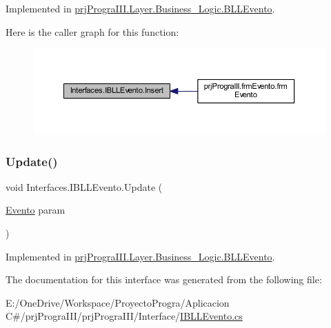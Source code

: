 Implemented in \hyperlink{classprj_progra_i_i_i_1_1_layer_1_1_business___logic_1_1_b_l_l_evento_a9e31720e59b580db4bff3b1ab7d3e284}{prj\+Progra\+I\+I\+I.\+Layer.\+Business\+\_\+\+Logic.\+B\+L\+L\+Evento}.

Here is the caller graph for this function\+:
\nopagebreak
\begin{figure}[H]
\begin{center}
\leavevmode
\includegraphics[width=350pt]{interface_interfaces_1_1_i_b_l_l_evento_ad26c4dba0bce0ce649b1e68e21cc194a_icgraph}
\end{center}
\end{figure}
\hypertarget{interface_interfaces_1_1_i_b_l_l_evento_a905ad055ff01af7bace9440339d07514}{}\label{interface_interfaces_1_1_i_b_l_l_evento_a905ad055ff01af7bace9440339d07514} 
\subsubsection{\texorpdfstring{Update()}{Update()}}
{\footnotesize\ttfamily void Interfaces.\+I\+B\+L\+L\+Evento.\+Update (\begin{DoxyParamCaption}\item[{\hyperlink{classprj_progra_i_i_i_1_1_layer_1_1_entities_1_1_evento}{Evento}}]{param }\end{DoxyParamCaption})}



Implemented in \hyperlink{classprj_progra_i_i_i_1_1_layer_1_1_business___logic_1_1_b_l_l_evento_ad9bbb373b1a005e7ef584586ad20f387}{prj\+Progra\+I\+I\+I.\+Layer.\+Business\+\_\+\+Logic.\+B\+L\+L\+Evento}.



The documentation for this interface was generated from the following file\+:\begin{DoxyCompactItemize}
\item 
E\+:/\+One\+Drive/\+Workspace/\+Proyecto\+Progra/\+Aplicacion C\#/prj\+Progra\+I\+I\+I/prj\+Progra\+I\+I\+I/\+Interface/\hyperlink{_i_b_l_l_evento_8cs}{I\+B\+L\+L\+Evento.\+cs}\end{DoxyCompactItemize}
